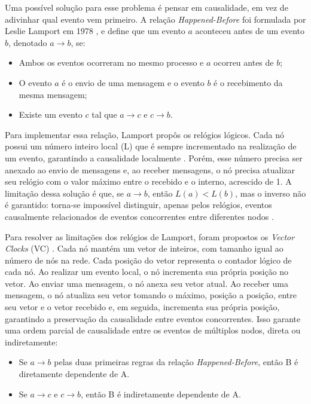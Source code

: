 Uma possível solução para esse problema é pensar em causalidade, em vez de adivinhar qual evento vem primeiro.
A relação \textit{Happened-Before} foi formulada por Leslie Lamport em 1978 \cite{lamport1978}, e define que um evento $a$ aconteceu
antes de um evento $b$, denotado $a \rightarrow b$, se:
\begin{itemize}
    \item Ambos os eventos ocorreram no mesmo processo e $a$ ocorreu antes de $b$;
    \item O evento $a$ é o envio de uma mensagem e o evento $b$ é o recebimento da mesma mensagem;
    \item Existe um evento $c$ tal que $a \rightarrow c$ e $c \rightarrow b$.
\end{itemize}

Para implementar essa relação, Lamport propôs os relógios lógicos. Cada nó possui um número inteiro local (L) que é sempre
incrementado na realização de um evento, garantindo a causalidade localmente \cite{lamport1978}. Porém, esse número precisa ser anexado ao
envio de mensagens e, ao receber mensagens, o nó precisa atualizar seu relógio com o valor máximo entre o recebido e o interno,
acrescido de 1. A limitação dessa solução é que, se $a \rightarrow b$, então $L(a) < L(b)$, mas o inverso não é garantido:
torna-se impossível distinguir, apenas pelos relógios, eventos causalmente relacionados de eventos concorrentes entre diferentes nodos \cite{fidge1988,mattern1989}.

Para resolver as limitações dos relógios de Lamport, foram propostos os \textit{Vector Clocks} (VC) \cite{fidge1988,mattern1989}. Cada nó mantém
um vetor de inteiros, com tamanho igual ao número de nós na rede. Cada posição do vetor representa o contador lógico de cada nó. Ao realizar
um evento local, o nó incrementa sua própria posição no vetor. Ao enviar uma mensagem, o nó anexa seu vetor atual. Ao receber uma mensagem,
o nó atualiza seu vetor tomando o máximo, posição a posição, entre seu vetor e o vetor recebido e, em seguida, incrementa sua própria posição, garantindo a preservação da causalidade entre eventos concorrentes.
Isso garante uma ordem parcial de causalidade entre os eventos de múltiplos nodos, direta ou indiretamente:
\begin{itemize}
    \item Se $a \rightarrow b$ pelas duas primeiras regras da relação \textit{Happened-Before}, então B é diretamente dependente de A.
    \item Se $a \rightarrow c$ e $c \rightarrow b$, então B é indiretamente dependente de A.
\end{itemize}


